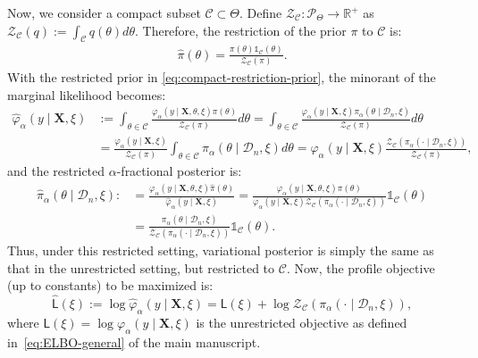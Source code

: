 \documentclass[12pt]{article}
\numberwithin{equation}{section}
\begin{document}
Now, we consider a compact subset $\mathcal{C} \subset \Theta$. Define $\mathcal{Z}_{\mathcal{C}}: \mathcal{P}_{\Theta} \rightarrow \mathbb{R}^{+}$ as $\mathcal{Z}_{\mathcal{C}}(q) := \int_{\mathcal{C}} q(\theta) d\theta$. Therefore, the restriction of the prior $\pi$ to $\mathcal{C}$ is:
\begin{align}\label{eq:compact-restriction-prior}
    \widehat{\pi}(\theta) = \frac{\pi(\theta)\mathds{1}_{\mathcal{C}}(\theta)}{\mathcal{Z}_{\mathcal{C}}(\pi)}.
\end{align} 
With the restricted prior in \eqref{eq:compact-restriction-prior}, the minorant of the marginal likelihood becomes:
%
\begin{equation}
\label{eq:compact-restriction-2}
\begin{split}
\widehat{\varphi}_{\alpha}(y \mid \mathbf{X}, \xi) &:= \int_{\theta \in \mathcal{C}} \frac{\varphi_{\alpha}(y \mid \mathbf{X}, \theta, \xi) \pi(\theta)}{\mathcal{Z}_{\mathcal{C}}(\pi)} d\theta = \int_{\theta \in \mathcal{C}} \frac{\varphi_{\alpha}(y \mid \mathbf{X}, \xi) \pi_{\alpha}(\theta \mid \mathcal{D}_n, \xi)}{\mathcal{Z}_{\mathcal{C}}(\pi)} d\theta\\
&= \frac{\varphi_{\alpha}(y \mid \mathbf{X}, \xi)}{\mathcal{Z}_{\mathcal{C}}(\pi)}\int_{\theta \in \mathcal{C}} { \pi_{\alpha}(\theta \mid \mathcal{D}_n, \xi)} d\theta 
= \varphi_{\alpha}(y \mid \mathbf{X}, \xi)\frac{\mathcal{Z}_{\mathcal{C}}(\pi_{\alpha}(\cdot \mid \mathcal{D}_n, \xi))}{\mathcal{Z}_{\mathcal{C}}(\pi)},
\end{split}
\end{equation}
%
and the restricted $\alpha$-fractional posterior is:
%
\begin{equation}
\label{eq:compact-restriction-3}
\begin{split}
\widehat{\pi}_{\alpha}(\theta \mid \mathcal{D}_n, \xi) :&= \frac{\varphi_{\alpha}(y \mid \mathbf{X}, \theta, \xi) \widehat{\pi}(\theta)}{\widehat{\varphi}_{\alpha}(y \mid \mathbf{X}, \xi)} = \frac{\varphi_{\alpha}(y \mid \mathbf{X}, \theta, \xi) \pi(\theta)}{\varphi_{\alpha}(y \mid \mathbf{X}, \xi)\mathcal{Z}_{\mathcal{C}}(\pi_{\alpha}(\cdot \mid \mathcal{D}_n, \xi))}\mathds{1}_{\mathcal{C}}(\theta) 
\\&
= \frac{\pi_{\alpha}(\theta \mid \mathcal{D}_n, \xi)}{\mathcal{Z}_{\mathcal{C}}(\pi_{\alpha}(\cdot \mid \mathcal{D}_n, \xi))}\mathds{1}_{\mathcal{C}}(\theta).
\end{split}
\end{equation}
%
Thus, under this {restricted} setting, variational posterior is simply the same as that in the unrestricted setting, but restricted to $\mathcal{C}$. Now, the profile objective (up to constants) to be maximized is: 
%
\begin{equation}
\label{eq:compact-restriction-3a}
\widehat{\mathsf{L}}(\xi) := \log \widehat{\varphi}_{\alpha}(y \mid \mathbf{X}, \xi) = \mathsf{L}(\xi) + \log \mathcal{Z}_{\mathcal{C}}(\pi_{\alpha}(\cdot \mid \mathcal{D}_n, \xi)),
\end{equation}
%
where $\mathsf{L}(\xi) = \log \varphi_{\alpha}(y \mid \mathbf{X}, \xi)$ is the {unrestricted} objective as defined in~\eqref{eq:ELBO-general} of the main manuscript. 
\end{document}
